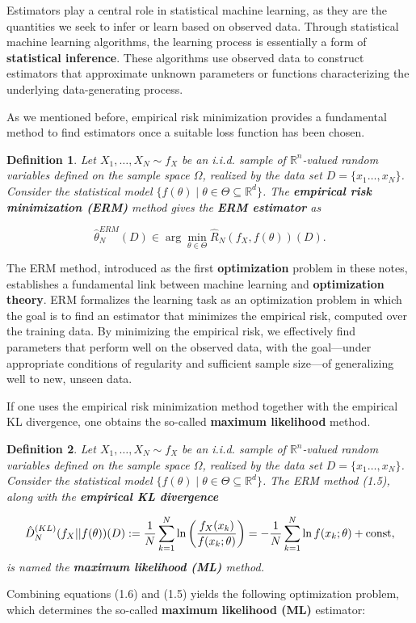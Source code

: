 \documentclass{report}
\newtheorem{definition}{Definition}[chapter]
\begin{document}
Estimators play a central role in statistical machine learning, as they are the quantities we seek to infer or learn based on observed data. Through statistical machine learning algorithms, the learning process is essentially a form of \textbf{statistical inference}. These algorithms use observed data to construct estimators that approximate unknown parameters or functions characterizing the underlying data-generating process.

As we mentioned before, empirical risk minimization provides a fundamental method to find estimators once a suitable loss function has been chosen.

\begin{definition}
Let $X_1,\dots,X_N \sim f_X$ be an i.i.d. sample of $\mathbb{R}^n$-valued random variables defined on the sample space $\Omega$, realized by the data set $D = \{x_1\dots,x_N\}$. Consider the statistical model $\{f(\theta) \mid \theta \in \Theta \subseteq \mathbb{R}^d\}$. The \textbf{empirical risk minimization (ERM)} method gives the \textbf{ERM estimator} as

\begin{equation}
\hat{\theta}^{ERM}_N(D) \in \arg\min_{\theta \in \Theta}\hat{R}_N(f_X,f(\theta))(D).
\end{equation}
\end{definition}
The ERM method, introduced as the first \textbf{optimization} problem in these notes, establishes a fundamental link between machine learning and \textbf{optimization theory}. ERM formalizes the learning task as an optimization problem in which the goal is to find an estimator that minimizes the empirical risk, computed over the training data. By minimizing the empirical risk, we effectively find parameters that perform well on the observed data, with the goal—under appropriate conditions of regularity and sufficient sample size—of generalizing well to new, unseen data.

If one uses the empirical risk minimization method together with the empirical KL divergence, one obtains the so-called \textbf{maximum likelihood} method.

\begin{definition}
Let $X_1,\dots,X_N \sim f_X$ be an i.i.d. sample of $\mathbb{R}^n$-valued random variables defined on the sample space $\Omega$, realized by the data set $D=\{x_1\dots,x_N\}$. Consider the statistical model $\{f(\theta) \mid \theta \in \Theta \subseteq \mathbb{R}^d\}$. The ERM method (1.5), along with the \textbf{empirical KL divergence}

\begin{equation}
\hat{D}^{(KL)}_N(f_X||f(\theta))(D) := \frac{1}{N} \sum_{k=1}^{N} \ln \left(\frac{f_X(x_k)}{f(x_k;\theta)}\right) = -\frac{1}{N} \sum_{k=1}^{N} \ln f(x_k;\theta) + \textup{const},
\end{equation}
is named the \textbf{maximum likelihood (ML)} method.
\end{definition}
Combining equations (1.6) and (1.5) yields the following optimization problem, which determines the so-called \textbf{maximum likelihood (ML)} estimator:
\end{document}
